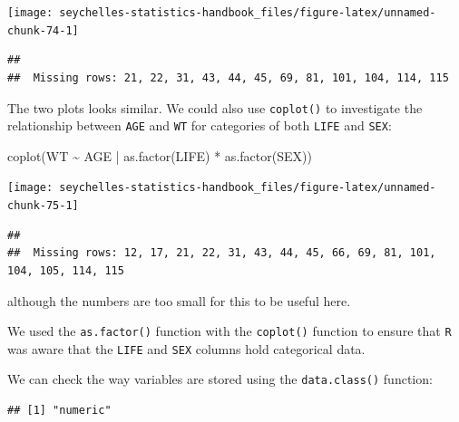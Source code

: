 \documentclass[
  12pt,
]{book}
\newenvironment{Shaded}{\begin{snugshade}}{\end{snugshade}}
\newcommand{\FunctionTok}[1]{\textcolor[rgb]{0.00,0.00,0.00}{#1}}
\newcommand{\NormalTok}[1]{#1}
\newcommand{\SpecialCharTok}[1]{\textcolor[rgb]{0.00,0.00,0.00}{#1}}
\begin{document}
\begin{center}\texttt{[image: seychelles-statistics-handbook\_files/figure-latex/unnamed-chunk-74-1]} \end{center}

\begin{verbatim}
## 
##  Missing rows: 21, 22, 31, 43, 44, 45, 69, 81, 101, 104, 114, 115
\end{verbatim}

\newpage

The two plots looks similar. We could also use \texttt{coplot()} to investigate the relationship between \texttt{AGE} and \texttt{WT} for categories of both \texttt{LIFE} and \texttt{SEX}:

\begin{Shaded}
\begin{Highlighting}[]
\FunctionTok{coplot}\NormalTok{(WT }\SpecialCharTok{\textasciitilde{}}\NormalTok{ AGE }\SpecialCharTok{|} \FunctionTok{as.factor}\NormalTok{(LIFE) }\SpecialCharTok{*} \FunctionTok{as.factor}\NormalTok{(SEX))}
\end{Highlighting}
\end{Shaded}

\begin{center}\texttt{[image: seychelles-statistics-handbook\_files/figure-latex/unnamed-chunk-75-1]} \end{center}

\begin{verbatim}
## 
##  Missing rows: 12, 17, 21, 22, 31, 43, 44, 45, 66, 69, 81, 101, 104, 105, 114, 115
\end{verbatim}

although the numbers are too small for this to be useful here.

We used the \texttt{as.factor()} function with the \texttt{coplot()} function to ensure that \texttt{R} was aware that the \texttt{LIFE}
and \texttt{SEX} columns hold categorical data.

We can check the way variables are stored using the \texttt{data.class()} function:

\begin{Shaded}
\end{Shaded}

\begin{verbatim}
## [1] "numeric"
\end{verbatim}
\end{document}
